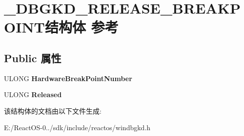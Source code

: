 \hypertarget{struct___d_b_g_k_d___r_e_l_e_a_s_e___b_r_e_a_k_p_o_i_n_t}{}\section{\+\_\+\+D\+B\+G\+K\+D\+\_\+\+R\+E\+L\+E\+A\+S\+E\+\_\+\+B\+R\+E\+A\+K\+P\+O\+I\+N\+T结构体 参考}
\label{struct___d_b_g_k_d___r_e_l_e_a_s_e___b_r_e_a_k_p_o_i_n_t}
\subsection*{Public 属性}
\begin{DoxyCompactItemize}
\item 
\mbox{\label{struct___d_b_g_k_d___r_e_l_e_a_s_e___b_r_e_a_k_p_o_i_n_t_a896f39bb8b1707f6ea025d7ecd3c0099}} 
U\+L\+O\+NG {\bfseries Hardware\+Break\+Point\+Number}
\item 
\mbox{\label{struct___d_b_g_k_d___r_e_l_e_a_s_e___b_r_e_a_k_p_o_i_n_t_a668f77996a1ef01e2b3e62fe86f1cf22}} 
U\+L\+O\+NG {\bfseries Released}
\end{DoxyCompactItemize}


该结构体的文档由以下文件生成\+:\begin{DoxyCompactItemize}
\item 
E\+:/\+React\+O\+S-\/0../sdk/include/reactos/windbgkd.\+h\end{DoxyCompactItemize}
